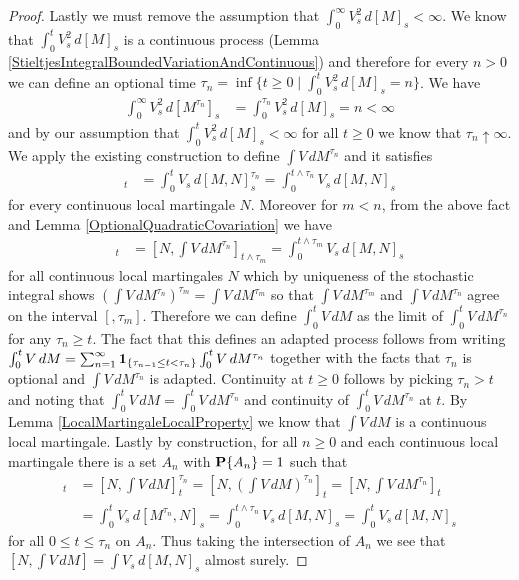 \begin{proof}
Lastly we must remove the assumption that $\int_0^\infty V_s^2 \, d[M]_s < \infty$.  We know that $\int_0^t V_s^2 \, d[M]_s$ is a continuous process (Lemma \ref{StieltjesIntegralBoundedVariationAndContinuous}) and therefore for every $n >0$ we can define an optional time $\tau_n = \inf \lbrace t \geq 0 \mid \int_0^t V_s^2 \, d[M]_s = n \rbrace$.  We have
\begin{align*}
\int_0^\infty V_s^2 \, d[M^{\tau_n}]_s &= \int_0^{\tau_n} V^2_s \, d[M]_s = n < \infty
\end{align*}
and by our assumption that $\int_0^t V_s^2 \, d[M]_s < \infty$ for all $t \geq 0$ we know that $\tau_n \uparrow \infty$.  We apply the existing construction to define $\int V \, dM^{\tau_n}$ and it satisfies 
\begin{align*}
[N, \int V \, dM^{\tau_n}]_t  &= \int_0^t V_s \, d[M,N]^{\tau_n}_s = \int_0^{t\wedge\tau_n} V_s \, d[M,N]_s
\end{align*}
for every continuous local martingale $N$.  Moreover for $m < n$, from the above fact and Lemma \ref{OptionalQuadraticCovariation} we have
\begin{align*}
[N, \left(\int V \, dM^{\tau_n}\right)^{\tau_m}]_t &= [N, \int V \, dM^{\tau_n}]_{t \wedge \tau_m} =\int_0^{t\wedge\tau_m} V_s \, d[M,N]_s
\end{align*}
for all continuous local martingales $N$ which by uniqueness of the stochastic integral shows $\left(\int V \, dM^{\tau_n}\right)^{\tau_m} = \int V \, dM^{\tau_m}$ so that $\int V \, dM^{\tau_m}$ and $\int V \, dM^{\tau_n}$ agree on the interval $[,\tau_m]$.  Therefore we can define $\int_0^t V \, dM$ as the limit of $\int_0^t V \, dM^{\tau_n}$ for any $\tau_n \geq t$.  The fact that this defines an adapted process follows from writing $\int_0^t V \, dM = \sum_{n=1}^\infty \textbf{1}_{\lbrace \tau_{n-1} \leq t < \tau_n\rbrace} \int_0^t V \, dM^{\tau_n}$ together with the facts that $\tau_n$ is optional and $\int V \, dM^{\tau_n}$ is adapted.  Continuity at $t \geq 0$ follows by picking $\tau_n > t$ and noting that $\int_0^t V \, dM = \int_0^t V \, dM^{\tau_n}$ and continuity of $\int_0^t V \, dM^{\tau_n}$ at $t$.  By Lemma \ref{LocalMartingaleLocalProperty} we know that $\int V \, dM$ is a continuous local martingale.  Lastly by construction, for all $n \geq 0$ and each continuous local martingale there is a set $A_n$ with $\textbf{P}\{A_n\} =1$ such that
\begin{align*}
[N, \int V \, dM]_t &=[N, \int V \, dM]^{\tau_n}_t = [N, \left(\int V \, dM\right)^{\tau_n}]_t = [N, \int V \, dM^{\tau_n}]_t \\
&= \int_0^t V_s \, d[M^{\tau_n}, N]_s = \int_0^{t\wedge \tau_n} V_s \, d[M, N]_s = \int_0^{t} V_s \, d[M, N]_s
\end{align*}
for all $0 \leq t \leq \tau_n$ on $A_n$.  Thus taking the intersection of $A_n$ we see that $[N, \int V \, dM] = \int V_s \, d[M,N]_s$ almost surely.
\end{proof}

